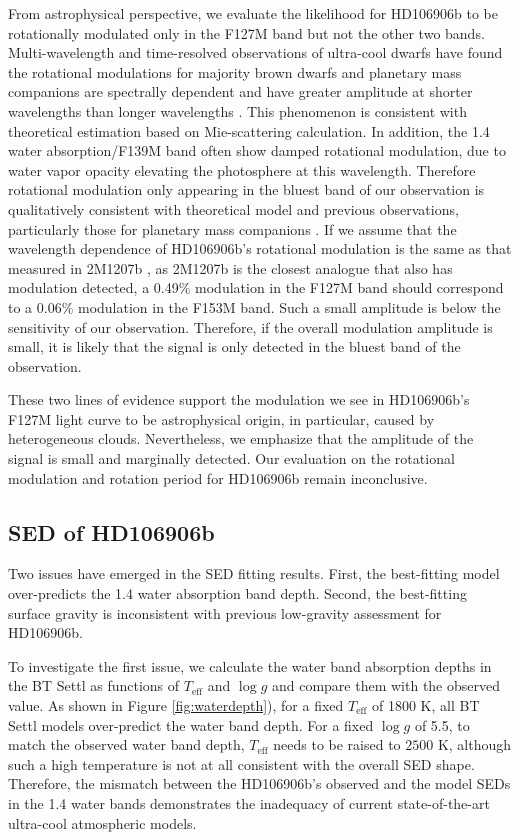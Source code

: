 \documentclass[twocolumn]{aastex62}
\begin{document}
From astrophysical perspective, we evaluate the likelihood for HD106906b to be rotationally modulated only in the F127M band but not the other two bands. Multi-wavelength and time-resolved observations of ultra-cool dwarfs have found the rotational modulations for majority  brown dwarfs and planetary mass companions are spectrally dependent and have greater amplitude at shorter wavelengths than longer wavelengths \citep[e.g.,][]{Zhou2019,Zhou2016,Yang2014,Apai2013,Schlawin}. This phenomenon is consistent with theoretical estimation based on Mie-scattering calculation\citep{Schlawin,Hiranaka2016}. In addition, the 1.4 \micron{} water absorption/F139M band often show damped rotational modulation, due to water vapor opacity elevating the photosphere at this wavelength.  Therefore rotational modulation only appearing in the bluest band of our observation is qualitatively consistent with theoretical model and previous observations, particularly those for planetary mass companions \citep{Zhou2016,Zhou2019}. If we assume that the wavelength dependence of HD106906b's rotational modulation is the same as that measured in 2M1207b \citep{Zhou2016}, as 2M1207b is the closest analogue that also has modulation detected, a 0.49\% modulation in the F127M band should correspond to a 0.06\% modulation in the F153M band. Such a small amplitude is below the sensitivity of our observation. Therefore, if the overall modulation amplitude is small, it is likely that the signal is only detected in the bluest band of the observation.

These two lines of evidence support the modulation we see in HD106906b's F127M light curve to be astrophysical origin, in particular, caused by heterogeneous clouds. Nevertheless, we emphasize that the amplitude of the signal is small and marginally detected. Our evaluation on the rotational modulation and rotation period for HD106906b remain inconclusive.


\subsection{SED of  HD106906b}
Two issues have emerged in the SED fitting results. First, the best-fitting model over-predicts the 1.4 \micron{} water absorption band depth. Second, the best-fitting surface gravity is inconsistent with previous low-gravity assessment for HD106906b.

To investigate the first issue, we calculate the water band absorption depths in the BT Settl as functions of $T_{\mathrm{eff}}$ and $\log g$ and compare them with the observed value. As shown in Figure \ref{fig:waterdepth}), for a fixed $T_{\mathrm{eff}}$ of 1800 K, all BT Settl models over-predict the water band depth. For a fixed $\log g$ of 5.5, to match the observed water band depth, $T_{\mathrm{eff}}$ needs to be raised to $2500$ K, although such a high temperature is not at all consistent with the overall SED shape. Therefore, the mismatch between the HD106906b's observed and the model SEDs in the 1.4 \micron{} water bands demonstrates the inadequacy of current state-of-the-art ultra-cool atmospheric models.
\end{document}
